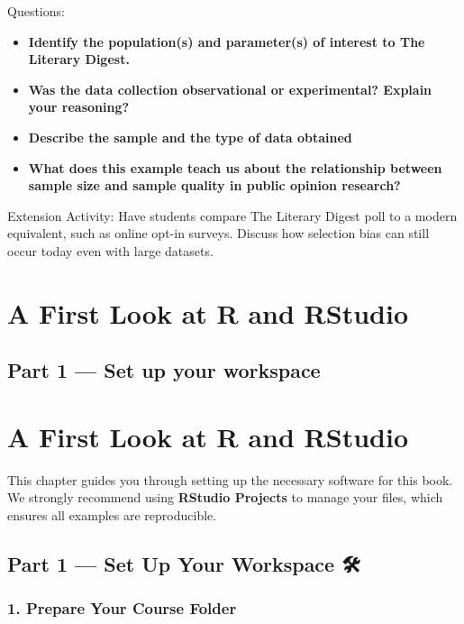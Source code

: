 \documentclass[
  letterpaper,
  DIV=11,
  numbers=noendperiod]{scrreprt}
\providecommand{\tightlist}{%
  \setlength{\itemsep}{0pt}\setlength{\parskip}{0pt}}
\begin{document}
Questions:

\begin{itemize}
\tightlist
\item
  \textbf{Identify the population(s) and parameter(s) of interest to The
  Literary Digest. }
\item
  \textbf{Was the data collection observational or experimental? Explain
  your reasoning? }
\item
  \textbf{Describe the sample and the type of data obtained }
\item
  \textbf{What does this example teach us about the relationship between
  sample size and sample quality in public opinion research? }
\end{itemize}

Extension Activity: Have students compare The Literary Digest poll to a
modern equivalent, such as online opt-in surveys. Discuss how selection
bias can still occur today even with large datasets.

\section{A First Look at R and
RStudio}\label{a-first-look-at-r-and-rstudio}

\subsection{Part 1 --- Set up your
workspace}\label{part-1-set-up-your-workspace}

\section{A First Look at R and
RStudio}\label{a-first-look-at-r-and-rstudio-1}

This chapter guides you through setting up the necessary software for
this book. We strongly recommend using \textbf{RStudio Projects} to
manage your files, which ensures all examples are reproducible.

\subsection{Part 1 --- Set Up Your Workspace
🛠️}\label{part-1-set-up-your-workspace-1}

\subsubsection{1. Prepare Your Course
Folder}\label{prepare-your-course-folder}
\end{document}

